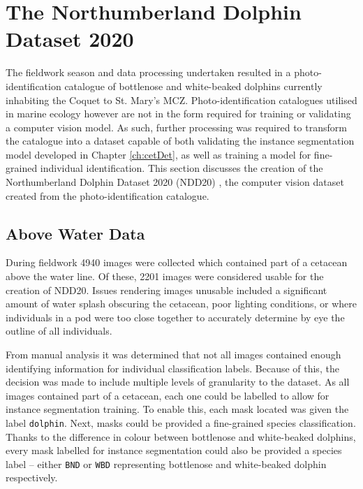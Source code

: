 \section{The Northumberland Dolphin Dataset 2020}\label{ch:NDD,sec:NDD20}

The fieldwork season and data processing undertaken resulted in a photo-identification catalogue of bottlenose and white-beaked dolphins currently inhabiting the Coquet to St. Mary's MCZ. Photo-identification catalogues utilised in marine ecology however are not in the form required for training or validating a computer vision model. As such, further processing was required to transform the catalogue into a dataset capable of both validating the instance segmentation model developed in Chapter \ref{ch:cetDet}, as well as training a model for fine-grained individual identification. This section discusses the creation of the Northumberland Dolphin Dataset 2020 (NDD20) \cite{trotter_ndd20_2020}, the computer vision dataset created from the photo-identification catalogue.

\subsection{Above Water Data}\label{ch:NDD,sec:NDD20,sub:aboveWaterData}

During fieldwork 4940 images were collected which contained part of a cetacean above the water line. Of these, 2201 images were considered usable for the creation of NDD20. Issues rendering images unusable included a significant amount of water splash obscuring the cetacean, poor lighting conditions, or where individuals in a pod were too close together to accurately determine by eye the outline of all individuals. 

From manual analysis it was determined that not all images contained enough identifying information for individual classification labels. Because of this, the decision was made to include multiple levels of granularity to the dataset. As all images contained part of a cetacean, each one could be labelled to allow for instance segmentation training. To enable this, each mask located was given the label \texttt{dolphin}. Next, masks could be provided a fine-grained species classification. Thanks to the difference in colour between bottlenose and white-beaked dolphins, every mask labelled for instance segmentation could also be provided a species label -- either \texttt{BND} or \texttt{WBD} representing bottlenose and white-beaked dolphin respectively. 


